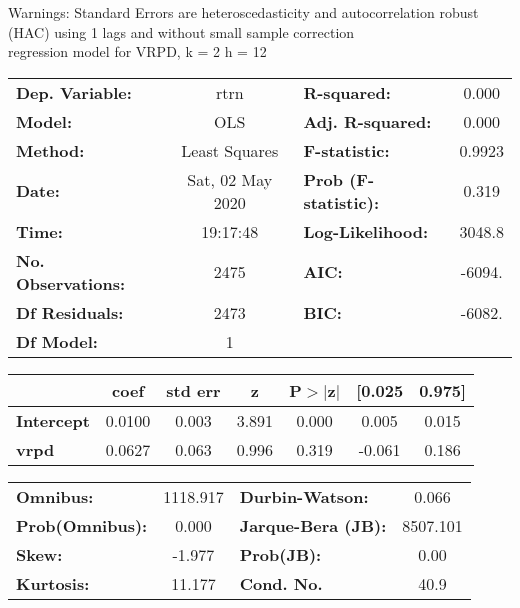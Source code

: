 Warnings: \newline
 [1] Standard Errors are heteroscedasticity and autocorrelation robust (HAC) using 1 lags and without small sample correction\\ 

regression model for VRPD, k = 2 h = 12\begin{center}
\begin{tabular}{lclc}
\toprule
\textbf{Dep. Variable:}    &       rtrn       & \textbf{  R-squared:         } &     0.000   \\
\textbf{Model:}            &       OLS        & \textbf{  Adj. R-squared:    } &     0.000   \\
\textbf{Method:}           &  Least Squares   & \textbf{  F-statistic:       } &    0.9923   \\
\textbf{Date:}             & Sat, 02 May 2020 & \textbf{  Prob (F-statistic):} &    0.319    \\
\textbf{Time:}             &     19:17:48     & \textbf{  Log-Likelihood:    } &    3048.8   \\
\textbf{No. Observations:} &        2475      & \textbf{  AIC:               } &    -6094.   \\
\textbf{Df Residuals:}     &        2473      & \textbf{  BIC:               } &    -6082.   \\
\textbf{Df Model:}         &           1      & \textbf{                     } &             \\
\bottomrule
\end{tabular}
\begin{tabular}{lcccccc}
                   & \textbf{coef} & \textbf{std err} & \textbf{z} & \textbf{P$> |$z$|$} & \textbf{[0.025} & \textbf{0.975]}  \\
\midrule
\textbf{Intercept} &       0.0100  &        0.003     &     3.891  &         0.000        &        0.005    &        0.015     \\
\textbf{vrpd}      &       0.0627  &        0.063     &     0.996  &         0.319        &       -0.061    &        0.186     \\
\bottomrule
\end{tabular}
\begin{tabular}{lclc}
\textbf{Omnibus:}       & 1118.917 & \textbf{  Durbin-Watson:     } &    0.066  \\
\textbf{Prob(Omnibus):} &   0.000  & \textbf{  Jarque-Bera (JB):  } & 8507.101  \\
\textbf{Skew:}          &  -1.977  & \textbf{  Prob(JB):          } &     0.00  \\
\textbf{Kurtosis:}      &  11.177  & \textbf{  Cond. No.          } &     40.9  \\
\bottomrule
\end{tabular}
\end{center}


